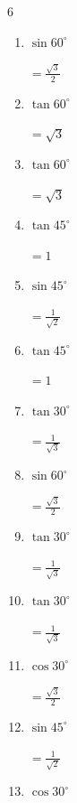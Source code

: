 \begin{multicols}{6}
\begin{enumerate}
        $\displaystyle =\frac{\sqrt{3}}{2}$

  \item $\displaystyle \sin{60^\circ}$

        $\displaystyle =\frac{\sqrt{3}}{2}$

  \item $\displaystyle \tan{60^\circ}$

        $\displaystyle =\sqrt{3}$

  \item $\displaystyle \tan{60^\circ}$

        $\displaystyle =\sqrt{3}$

  \item $\displaystyle \tan{45^\circ}$

        $\displaystyle =1$

  \item $\displaystyle \sin{45^\circ}$

        $\displaystyle =\frac{1}{\sqrt{2}}$

  \item $\displaystyle \tan{45^\circ}$

        $\displaystyle =1$

  \item $\displaystyle \tan{30^\circ}$

        $\displaystyle =\frac{1}{\sqrt{3}}$

  \item $\displaystyle \sin{60^\circ}$

        $\displaystyle =\frac{\sqrt{3}}{2}$

  \item $\displaystyle \tan{30^\circ}$

        $\displaystyle =\frac{1}{\sqrt{3}}$

  \item $\displaystyle \tan{30^\circ}$

        $\displaystyle =\frac{1}{\sqrt{3}}$

  \item $\displaystyle \cos{30^\circ}$

        $\displaystyle =\frac{\sqrt{3}}{2}$

  \item $\displaystyle \sin{45^\circ}$

        $\displaystyle =\frac{1}{\sqrt{2}}$

  \item $\displaystyle \cos{30^\circ}$


\end{enumerate}
\end{multicols}
